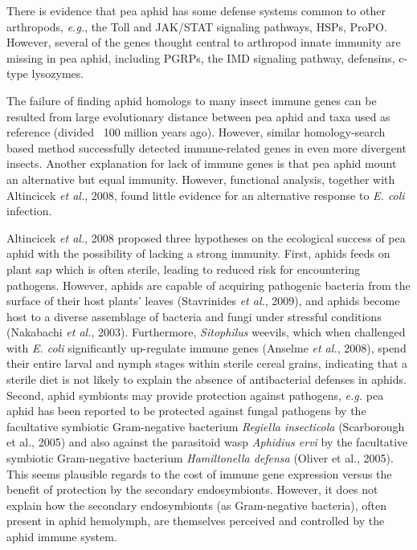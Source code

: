 \documentclass[11pt]{article}
\begin{document}
\begin{sloppypar}
\par
There is evidence that pea aphid has some defense systems common to other arthropods, \textit{e.g.}, the Toll and JAK/STAT signaling pathways, HSPs, ProPO. 
However, several of the genes thought central to arthropod innate immunity are missing in pea aphid, including PGRPs, the IMD signaling pathway, defensins, c-type lysozymes. 
\par
The failure of finding aphid homologs to many insect immune genes can be resulted from large evolutionary distance between pea aphid and taxa used as reference (divided ~100 million years ago). 
However, similar homology-search based method successfully detected immune-related genes in even more divergent insects. 
Another explanation for lack of immune genes is that pea aphid mount an alternative but equal immunity. 
However, functional analysis, together with Altincicek \textit{et al.}, 2008, found little evidence for an alternative response to \textit{E. coli} infection. 
\par
Altincicek \textit{et al.}, 2008 proposed three hypotheses on the ecological success of pea aphid with the possibility of lacking a strong immunity. 
First, aphids feeds on plant sap which is often sterile, leading to reduced risk for encountering pathogens. 
However, aphids are capable of acquiring pathogenic bacteria from the surface of their host plants’ leaves (Stavrinides \textit{et al.}, 2009), and aphids become host to a diverse assemblage of bacteria and fungi under stressful conditions (Nakabachi \textit{et al.}, 2003). 
Furthermore, \textit{Sitophilus} weevils, which when challenged with \textit{E. coli} significantly up-regulate immune genes (Anselme \textit{et al.}, 2008), spend their entire larval and nymph stages within sterile cereal grains, indicating that a sterile diet is not likely to explain the absence of antibacterial defenses in aphids. 
Second, aphid symbionts may provide protection against pathogens, \textit{e.g.} pea aphid has been reported to be protected against fungal pathogens by the facultative symbiotic Gram-negative bacterium \textit{Regiella insecticola} (Scarborough et al., 2005) and also against the parasitoid wasp \textit{Aphidius ervi} by the facultative symbiotic Gram-negative bacterium \textit{Hamiltonella defensa} (Oliver et al., 2005). 
This seems plausible regards to the cost of immune gene expression versus the benefit of protection by the secondary endosymbionts. 
However, it does not explain how the secondary endosymbionts (as Gram-negative bacteria), often present in aphid hemolymph, are themselves perceived and controlled by the aphid immune system.

\end{sloppypar}
\end{document}

